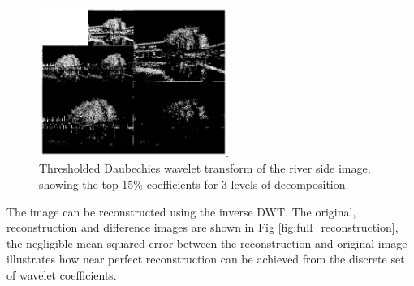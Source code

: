 \documentclass[11pt]{article}
\begin{document}
\begin{figure}[H]
    \centering
    \includegraphics[width=0.55\textwidth]{figs/q2c_river_side_wavelet_transform.jpeg}
    \caption{Thresholded Daubechies wavelet transform of the river side image, showing the top 15\% coefficients for 3 levels of decomposition.}
    \label{fig:wavelet_coefficients}
\end{figure}

The image can be reconstructed using the inverse DWT. The original, reconstruction and difference images are shown in Fig \ref{fig:full_reconstruction}, the negligible mean squared error between the reconstruction and original image illustrates how near perfect reconstruction can be achieved from the discrete set of wavelet coefficients. 
\end{document}
